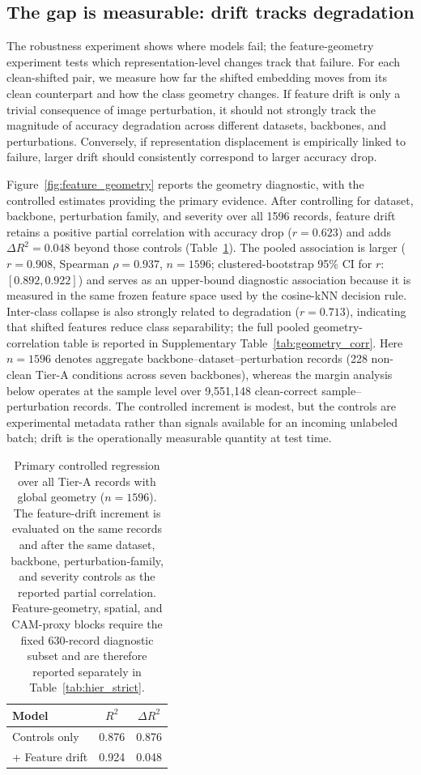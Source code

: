 \documentclass[a4paper,fleqn]{els-cas-templates/cas-sc}
\begin{document}
\subsection{The gap is measurable: drift tracks degradation}
\label{sec:results_drift}

The robustness experiment shows where models fail; the feature-geometry experiment tests which representation-level changes track that failure. For each clean-shifted pair, we measure how far the shifted embedding moves from its clean counterpart and how the class geometry changes. If feature drift is only a trivial consequence of image perturbation, it should not strongly track the magnitude of accuracy degradation across different datasets, backbones, and perturbations. Conversely, if representation displacement is empirically linked to failure, larger drift should consistently correspond to larger accuracy drop.

Figure~\ref{fig:feature_geometry} reports the geometry diagnostic, with the
controlled estimates providing the primary evidence. After controlling for
dataset, backbone, perturbation family,
and severity over all 1596 records, feature drift retains a positive partial
correlation with accuracy drop ($r=0.623$) and adds $\Delta R^2=0.048$ beyond
those controls (Table~\ref{tab:primary_controlled}). The pooled association is
larger ($r=0.908$,
Spearman $\rho=0.937$, $n=1596$; clustered-bootstrap 95\% CI for $r$:
$[0.892,0.922]$) and serves as an upper-bound diagnostic association because it
is measured in the same frozen feature space used by the cosine-kNN decision
rule. Inter-class collapse is also strongly related to degradation ($r=0.713$),
indicating that shifted features reduce class separability; the full pooled
geometry-correlation table is reported in Supplementary
Table~\ref{tab:geometry_corr}. Here $n=1596$
denotes aggregate backbone--dataset--perturbation records (228 non-clean Tier-A
conditions across seven backbones), whereas the margin analysis below operates
at the sample level over 9,551,148 clean-correct sample--perturbation records.
The controlled increment is modest, but the controls are experimental metadata
rather than signals available for an incoming unlabeled batch; drift is the
operationally measurable quantity at test time.

\begin{table}[pos=htbp]
\centering
\caption{Primary controlled regression over all Tier-A records with global
geometry ($n=1596$). The feature-drift increment is evaluated on the same
records and after the same dataset, backbone, perturbation-family, and severity
controls as the reported partial correlation. Feature-geometry, spatial, and
CAM-proxy blocks require the fixed 630-record diagnostic subset and are
therefore reported separately in Table~\ref{tab:hier_strict}.}
\label{tab:primary_controlled}
\small
\begin{tabular}{lcc}
\toprule
Model & $R^2$ & $\Delta R^2$ \\
\midrule
Controls only & 0.876 & 0.876 \\
+ Feature drift & 0.924 & 0.048 \\
\bottomrule
\end{tabular}
\end{table}
\end{document}
